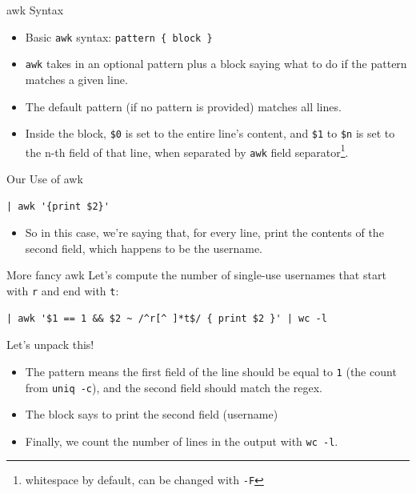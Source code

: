 \documentclass[12pt]{beamer}
\begin{document}
\begin{frame}{awk Syntax}
  \begin{itemize}
    \item Basic \texttt{awk} syntax: \texttt{pattern \{ block \}}
    \item \texttt{awk} takes in an optional pattern plus a block saying what to do if the pattern matches a given line.
    \item The default pattern (if no pattern is provided) matches all lines.
    \item Inside the block, \texttt{\$0} is set to the entire line's content, and \texttt{\$1} to \texttt{\$n} is set to the n-th field of that line, when separated by \texttt{awk} field separator\footnote{whitespace by default, can be changed with \texttt{-F}}.
  \end{itemize}
\end{frame}

\begin{frame}[fragile]{Our Use of awk}
  \begin{verbatim}
| awk '{print $2}'
  \end{verbatim}
  \begin{itemize}
    \item So in this case, we're saying that, for every line, print the contents of the second field, which happens to be the username.
  \end{itemize}
\end{frame}

\begin{frame}[fragile]{More fancy awk}
  Let’s compute the number of single-use usernames that start with \texttt{r} and end with \texttt{t}:
  \begin{verbatim}
| awk '$1 == 1 && $2 ~ /^r[^ ]*t$/ { print $2 }' | wc -l
  \end{verbatim}

  Let's unpack this!
  \begin{itemize}
    \item The pattern means the first field of the line should be equal to \texttt{1} (the count from \texttt{uniq -c}), and the second field should match the regex.
    \item The block says to print the second field (username)
    \item Finally, we count the number of lines in the output with \texttt{wc -l}.
  \end{itemize}
\end{frame}
\end{document}
